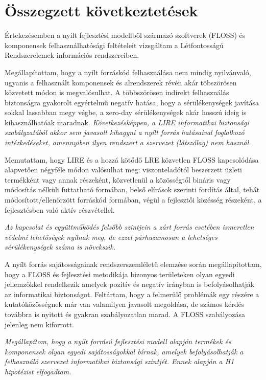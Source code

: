 \documentclass[12pt,magyar,a4paper,oneside]{scrreprt}
\begin{document}
\hypertarget{uxf6sszegzett-kuxf6vetkeztetuxe9sek}{%
\section{Összegzett
következtetések}\label{uxf6sszegzett-kuxf6vetkeztetuxe9sek}}

Értekezésemben a nyílt fejlesztési modellből származó szoftverek (FLOSS)
és komponensek felhasználhatósági feltételeit vizsgáltam a Létfontosságú
Rendszerelemek információs rendszereiben.

Megállapítottam, hogy a nyílt forráskód felhasználása nem mindig
nyilvánvaló, ugyanis a felhasznált komponensek és alrendszerek révén
akár töbszörösen közvetett módon is megvalósulhat. A többszörösen
indirekt felhasználás biztonságra gyakorolt egyértelmű negatív hatása,
hogy a sérülékenységek javítása sokkal lassabban megy végbe, a zero-day
sérülékenységek akár hosszú ideig is kihasználhatóak maradnak.
\emph{Következésképpen, a LIRE informatikai biztonsági szabályzatából
akkor sem javasolt kihagyni a nyílt forrás hatásaival foglalkozó
intézkedéseket, amennyiben ilyen rendszert a szervezet (látszólag) nem
használ.}

Memutattam, hogy LIRE és a hozzá kötődő LRE közvetlen FLOSS kapcsolódása
alapvetően négyféle módon valósulhat meg: viszonteladótól beszerzett
üzleti termékként vagy annak részeként, közvetlenül a közösségtől
bináris vagy módosítás nélküli futtatható formában, belső elírások
szerinti fordítás által, tehát módosított/ellenőrzött forráskód
formában, végül a fejlesztői közésség részeként, a fejlesztésben való
aktív részvétellel.

\emph{Az kapcsolat és együttműködés felsőbb szintjein a zárt forrás
esetében ismeretlen védelmi lehetőségek nyílnak meg, de ezzel
párhuzamosan a lehetséges sérülékenységek száma is növekszik.}

A nyílt forrás sajátosságainak rendszerszemléletű elemzése során
megállapítottam, hogy a FLOSS és fejlesztési metodikája bizonyos
területeken olyan egyedi jellemzőkkel rendelkezik amelyek pozitív és
negatív irányban is befolyásolhatják az informatikai biztonságot.
Feltártam, hogy a felmerülő problémák egy részére a kutatóközösségnek
már van valamilyen javasolt megoldása, de számos kérdés továbbra is
nyitott és gyakran szabályozatlan marad. A FLOSS szabályozása jelenleg
nem kiforrott.

\emph{Megállapítom, hogy a nyílt forrású fejlesztési modell alapján
termékek és komponensek olyan egyedi sajátosságokkal bírnak, amelyek
befolyásolhatják a felhasználó szervezet informatikai biztonsági
szintjét. Ennek alapján a H1 hipotézist elfogadtam.}
\end{document}
